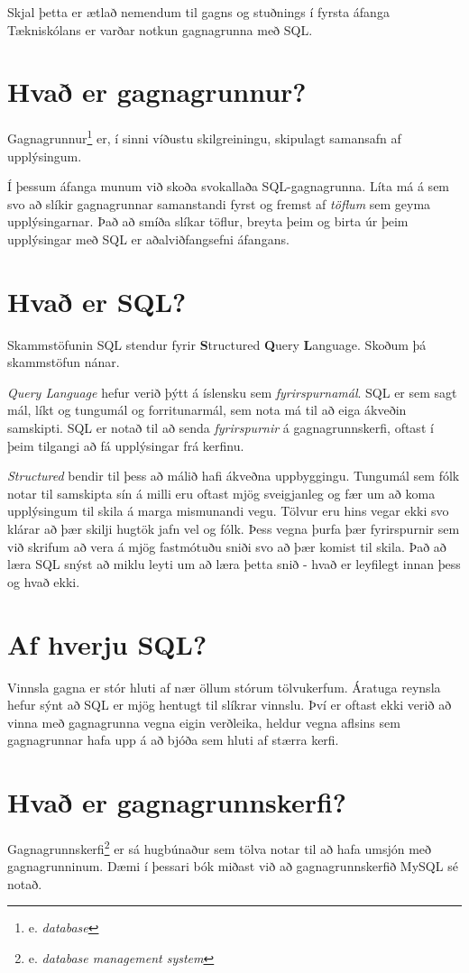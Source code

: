 Skjal þetta er ætlað nemendum til gagns og stuðnings í fyrsta áfanga Tækniskólans er varðar notkun gagnagrunna með SQL.
\section{Hvað er gagnagrunnur?}
Gagnagrunnur\footnote{e. \emph{database}} er, í sinni víðustu skilgreiningu, skipulagt samansafn af upplýsingum.

Í þessum áfanga munum við skoða svokallaða SQL-gagnagrunna.
Líta má á sem svo að slíkir gagnagrunnar samanstandi fyrst og fremst af \emph{töflum} sem geyma upplýsingarnar. Það að smíða slíkar töflur, breyta þeim og birta úr þeim upplýsingar með SQL er aðalviðfangsefni áfangans.
\section{Hvað er SQL?}
Skammstöfunin SQL stendur fyrir \textbf{S}tructured \textbf{Q}uery \textbf{L}anguage. Skoðum þá skammstöfun nánar.

\emph{Query Language} hefur verið þýtt á íslensku sem \emph{fyrirspurnamál}. SQL er sem sagt mál, líkt og tungumál og forritunarmál, sem nota má til að eiga ákveðin samskipti. SQL er notað til að senda \emph{fyrirspurnir} á gagnagrunnskerfi, oftast í þeim tilgangi að fá upplýsingar frá kerfinu.

\emph{Structured} bendir til þess að málið hafi ákveðna uppbyggingu. Tungumál sem fólk notar til samskipta sín á milli eru oftast mjög sveigjanleg og fær um að koma upplýsingum til skila á marga mismunandi vegu. Tölvur eru hins vegar ekki svo klárar að þær skilji hugtök jafn vel og fólk. Þess vegna þurfa þær fyrirspurnir sem við skrifum að vera á mjög fastmótuðu sniði svo að þær komist til skila. Það að læra SQL snýst að miklu leyti um að læra þetta snið - hvað er leyfilegt innan þess og hvað ekki.
\section{Af hverju SQL?}
Vinnsla gagna er stór hluti af nær öllum stórum tölvukerfum. Áratuga reynsla hefur sýnt að SQL er mjög hentugt til slíkrar vinnslu. Því er oftast ekki verið að vinna með gagnagrunna vegna eigin verðleika, heldur vegna aflsins sem gagnagrunnar hafa upp á að bjóða sem hluti af stærra kerfi.
\section{Hvað er gagnagrunnskerfi?}
Gagnagrunnskerfi\footnote{e. \emph{database management system}} er sá hugbúnaður sem tölva notar til að hafa umsjón með gagnagrunninum. Dæmi í þessari bók miðast við að gagnagrunnskerfið MySQL sé notað.

